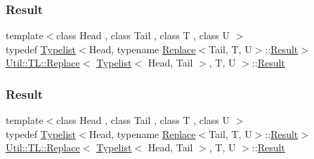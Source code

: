 \subsubsection{\texorpdfstring{Result}{Result}\hspace{0.1cm}{\footnotesize\ttfamily [1/3]}}
{\footnotesize\ttfamily template$<$class Head , class Tail , class T , class U $>$ \\
typedef \mbox{\hyperlink{structUtil_1_1Typelist}{Typelist}}$<$Head, typename \mbox{\hyperlink{structUtil_1_1TL_1_1Replace}{Replace}}$<$Tail, T, U$>$\+::\mbox{\hyperlink{structUtil_1_1TL_1_1Replace_3_01Typelist_3_01Head_00_01Tail_01_4_00_01T_00_01U_01_4_a218cadcba3503c01d97b4a6d4e65982c}{Result}}$>$ \mbox{\hyperlink{structUtil_1_1TL_1_1Replace}{Util\+::\+T\+L\+::\+Replace}}$<$ \mbox{\hyperlink{structUtil_1_1Typelist}{Typelist}}$<$ Head, Tail $>$, T, U $>$\+::\mbox{\hyperlink{structUtil_1_1TL_1_1Replace_3_01Typelist_3_01Head_00_01Tail_01_4_00_01T_00_01U_01_4_a218cadcba3503c01d97b4a6d4e65982c}{Result}}}

\mbox{\label{structUtil_1_1TL_1_1Replace_3_01Typelist_3_01Head_00_01Tail_01_4_00_01T_00_01U_01_4_a218cadcba3503c01d97b4a6d4e65982c}} 
\subsubsection{\texorpdfstring{Result}{Result}\hspace{0.1cm}{\footnotesize\ttfamily [2/3]}}
{\footnotesize\ttfamily template$<$class Head , class Tail , class T , class U $>$ \\
typedef \mbox{\hyperlink{structUtil_1_1Typelist}{Typelist}}$<$Head, typename \mbox{\hyperlink{structUtil_1_1TL_1_1Replace}{Replace}}$<$Tail, T, U$>$\+::\mbox{\hyperlink{structUtil_1_1TL_1_1Replace_3_01Typelist_3_01Head_00_01Tail_01_4_00_01T_00_01U_01_4_a218cadcba3503c01d97b4a6d4e65982c}{Result}}$>$ \mbox{\hyperlink{structUtil_1_1TL_1_1Replace}{Util\+::\+T\+L\+::\+Replace}}$<$ \mbox{\hyperlink{structUtil_1_1Typelist}{Typelist}}$<$ Head, Tail $>$, T, U $>$\+::\mbox{\hyperlink{structUtil_1_1TL_1_1Replace_3_01Typelist_3_01Head_00_01Tail_01_4_00_01T_00_01U_01_4_a218cadcba3503c01d97b4a6d4e65982c}{Result}}}


